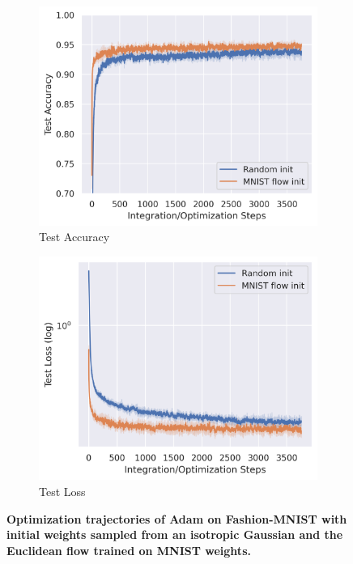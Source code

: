 \begin{figure}[h!]
    \centering
    \begin{subfigure}{0.47\linewidth}
        \centering
        \includegraphics[width=\linewidth]{figures/mnist/mnist_init_acc.png}
        \caption{Test Accuracy}
        
    \end{subfigure}
    \begin{subfigure}{0.47\linewidth}
        \centering
        \includegraphics[width=\linewidth]{figures/mnist/mnist_init_loss.png}
        \caption{Test Loss}
    \end{subfigure}
    \caption{\label{fig:mnist_init}\textbf{Optimization trajectories of Adam on Fashion-MNIST with initial weights sampled from an isotropic Gaussian and the Euclidean flow trained on MNIST weights.} } 
\end{figure}



